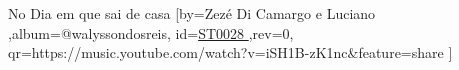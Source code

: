 \beginsong
{No Dia em que sai de casa %
}[by={Zezé Di Camargo e Luciano %
},album={@walyssondosreis},
id={\href{https://music.youtube.com/watch?v=iSH1B-zK1nc&feature=share %
}{ST0028 %
}},rev={0}, %
qr={https://music.youtube.com/watch?v=iSH1B-zK1nc&feature=share %
}]
\beginverse
